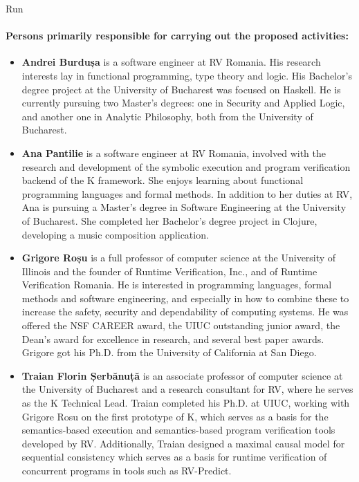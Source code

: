 \begin{sitedescription}{Run}
\paragraph{Persons primarily responsible for carrying out the proposed activities:}

\begin{itemize} %

\item{\bf Andrei Burdușa} is a software engineer at RV Romania.
His research interests lay in functional programming, type theory and logic.
His Bachelor's degree project at the University of Bucharest was focused on Haskell.
He is currently pursuing two Master’s degrees: one in Security and Applied Logic,
and another one in Analytic Philosophy, both from the University of Bucharest.

\item{\bf Ana Pantilie} is a software engineer at RV Romania, involved with the
research and development of the symbolic execution and program verification
backend of the K framework.
She enjoys learning about functional programming languages and formal methods.
In addition to her duties at RV, Ana is pursuing a Master's degree in Software
Engineering at the University of Bucharest.
She completed her Bachelor's degree project in Clojure, developing a music
composition application.

\item{\bf Grigore Roșu} is a full professor of computer science at the
University of Illinois and the founder of Runtime Verification, Inc., and of 
Runtime Verification Romania. He is interested in programming languages,
formal methods and software engineering, and especially in how to combine
these to increase the safety, security and dependability of computing systems.
He was offered the NSF CAREER award, the UIUC outstanding junior award,
the Dean's award for excellence in research, and several best paper awards.
Grigore got his Ph.D. from the University of California at San Diego.

\item{\bf Traian Florin Șerbănuță} is an associate professor of computer science
at the University of Bucharest and a research consultant for RV, where he serves
as the K Technical Lead.
Traian completed his Ph.D. at UIUC, working with Grigore Rosu
on the first prototype of K, which serves as a basis for the semantics-based execution
and semantics-based program verification tools developed by RV.
Additionally, Traian designed a maximal causal model for sequential consistency
which serves as a basis for runtime verification of concurrent programs in tools
such as RV-Predict.

\end{itemize}

\end{sitedescription}

